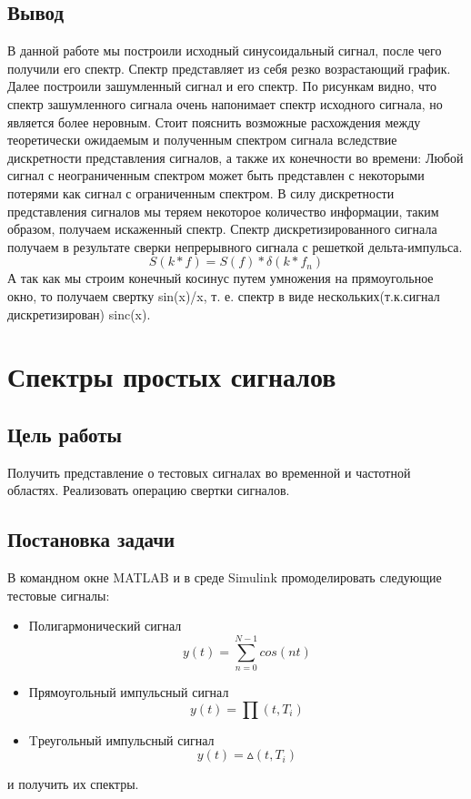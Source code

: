 \documentclass[10pt,a4paper]{article}
\begin{document}
\subsection{Вывод}
В данной работе мы построили исходный синусоидальный сигнал, после чего получили его спектр. Спектр представляет из себя резко возрастающий график. Далее построили зашумленный сигнал и его спектр. По рисункам видно, что спектр зашумленного сигнала очень напонимает спектр исходного сигнала, но является более неровным.
Стоит пояснить возможные расхождения между теоретически ожидаемым и полученным спектром сигнала вследствие дискретности представления сигналов, а также их конечности во времени:
Любой сигнал с неограниченным спектром может быть представлен с некоторыми потерями как сигнал с ограниченным спектром.
В силу дискретности представления сигналов мы теряем некоторое количество информации, таким образом, получаем искаженный спектр.
Спектр дискретизированного сигнала получаем в результате сверки непрерывного сигнала с решеткой дельта-импульса.
\begin{displaymath}
S(k*f)=S(f)*\delta(k*f_{n})
\end{displaymath}
А так как мы строим конечный косинус путем умножения на прямоугольное окно, то получаем свертку sin(x)/x, т. е. спектр в виде нескольких(т.к.сигнал дискретизирован) sinc(x).

\section{Спектры простых сигналов}
\subsection{Цель работы}
Получить представление о тестовых сигналах во временной и частотной областях. Реализовать операцию свертки сигналов.
\subsection{Постановка задачи}
В командном окне MATLAB и в среде Simulink промоделировать следующие тестовые сигналы:
\begin{itemize}
\item Полигармонический сигнал 
	\begin{equation}
	y(t) = \sum_{n=0}^{{N}-1}cos{(nt)}
	\end{equation}
\item Прямоугольный импульсный сигнал
	\begin{equation}
	y(t) = \prod(t, T_i)
	\end{equation}
\item Tреугольный импульсный сигнал
	\begin{equation}
	y(t) = \vartriangle(t, T_i)
	\end{equation}
\end{itemize}
и получить их спектры.
\end{document}
